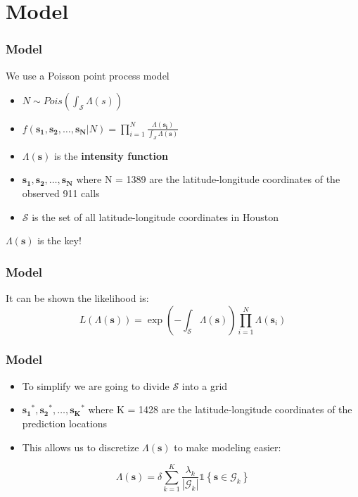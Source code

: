 \documentclass[10pt, compress]{beamer}
\begin{document}
  \section{Model}
  \begin{frame}
    \frametitle{Model}
    We use a Poisson point process model
      \begin{itemize}
        \item $N \sim Pois(\int_{\mathcal{S}} \Lambda(s))$
        \item $f(\mathbf{s_1}, \mathbf{s_2}, \dots, \mathbf{s_N}|N) = \prod_{i=1}^{N} \frac{\Lambda(\mathbf{s_i})}{\int_{\mathcal{S}}\Lambda(\mathbf{s})}$ 
        \item $\Lambda(\mathbf{s})$ is the \textbf{intensity function}
        \item $\mathbf{s_1}, \mathbf{s_2}, \dots, \mathbf{s_N}$ where N = 1389 are the latitude-longitude coordinates of the observed 911 calls
        \item $\mathcal{S}$ is the set of all latitude-longitude coordinates in Houston
      \end{itemize}
    \pause
    $\Lambda(\mathbf{s})$ is the key!
  \end{frame}
  \begin{frame}
    \frametitle{Model}
    It can be shown the likelihood is:
      $$L(\Lambda(\mathbf{s})) = \exp\left(-\int_{\mathcal{S}}\Lambda(\mathbf{s})\right) \prod_{i=1}^{N}\Lambda(\mathbf{s}_i)$$
  \end{frame}
  \begin{frame}
    \frametitle{Model}
    \begin{itemize}
      \item To simplify we are going to divide $\mathcal{S}$ into a grid
      \item $\mathbf{s_1}^{*}, \mathbf{s_2}^{*}, \dots, \mathbf{s_K}^{*}$ where K = 1428 are the latitude-longitude coordinates of the  prediction locations
      \item This allows us to discretize $\Lambda(\mathbf{s})$ to make modeling easier:
    \end{itemize}
        $$ \Lambda(\mathbf{s}) = \delta \sum_{k=1}^K \frac{\lambda_k}{|\mathcal{G}_k|} \mathds{1} \left\{ \mathbf{s} \in \mathcal{G}_k \right\} $$
  \end{frame}
\end{document}
